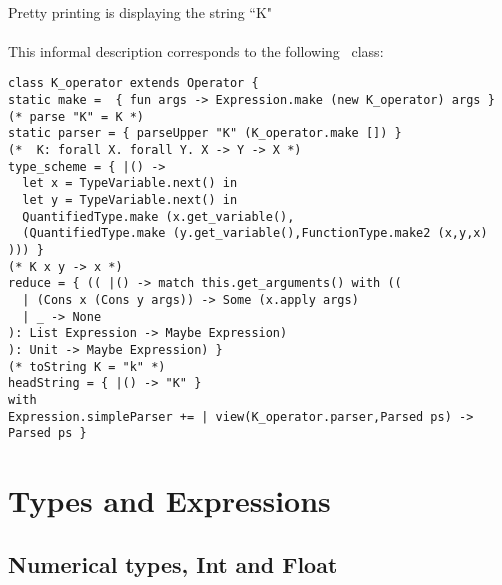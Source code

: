 \documentclass[12pt]{article}
\begin{document}
\paragraph*{}
Pretty printing is displaying the string ``K"
\paragraph*{}
This informal description corresponds to the following \bondi\ class:
\scriptsize
\begin{Verbatim}[frame=single,framerule=0.2pt,framesep=6pt] 
class K_operator extends Operator {
static make =  { fun args -> Expression.make (new K_operator) args } 
(* parse "K" = K *)
static parser = { parseUpper "K" (K_operator.make []) }   
(*  K: forall X. forall Y. X -> Y -> X *)
type_scheme = { |() ->                                    
  let x = TypeVariable.next() in 
  let y = TypeVariable.next() in 
  QuantifiedType.make (x.get_variable(),
  (QuantifiedType.make (y.get_variable(),FunctionType.make2 (x,y,x) 
))) }
(* K x y -> x *)
reduce = { (( |() -> match this.get_arguments() with ((  
  | (Cons x (Cons y args)) -> Some (x.apply args)
  | _ -> None
): List Expression -> Maybe Expression)
): Unit -> Maybe Expression) }
(* toString K = "k" *)
headString = { |() -> "K" }                              
with 
Expression.simpleParser += | view(K_operator.parser,Parsed ps) -> Parsed ps }
\end{Verbatim}
\normalsize


\section{Types and Expressions}


\subsection{Numerical types, Int and Float}
\end{document}
